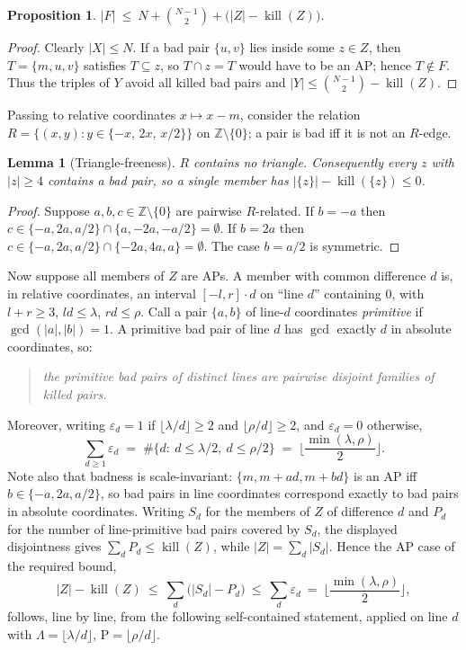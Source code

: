 \documentclass[11pt]{article}
\newtheorem{lemma}[theorem]{Lemma}
\newtheorem{proposition}[theorem]{Proposition}
\theoremstyle{definition}
\newcommand{\Z}{\mathbb{Z}}
\newcommand{\killop}{\operatorname{kill}}
\begin{document}
\begin{proposition}\label{prop:red}
$|F|\ \le\ N+\binom{N-1}{2}+\big(|Z|-\killop(Z)\big)$.
\end{proposition}

\begin{proof}
Clearly $|X|\le N$. If a bad pair $\{u,v\}$ lies inside some $z\in Z$, then $T=\{m,u,v\}$ satisfies $T\subseteq z$, so $T\cap z=T$ would have to be an AP; hence $T\notin F$. Thus the triples of $Y$ avoid all killed bad pairs and $|Y|\le\binom{N-1}{2}-\killop(Z)$.
\end{proof}

Passing to relative coordinates $x\mapsto x-m$, consider the relation
$R=\{(x,y): y\in\{-x,\,2x,\,x/2\}\}$ on $\Z\setminus\{0\}$;
a pair is bad iff it is not an $R$-edge.

\begin{lemma}[Triangle-freeness]\label{lem:tri}
$R$ contains no triangle. Consequently every $z$ with $|z|\ge 4$ contains a bad pair, so a single member has $|\{z\}|-\killop(\{z\})\le 0$.
\end{lemma}

\begin{proof}
Suppose $a,b,c\in\Z\setminus\{0\}$ are pairwise $R$-related. If $b=-a$ then $c\in\{-a,2a,a/2\}\cap\{a,-2a,-a/2\}=\emptyset$. If $b=2a$ then $c\in\{-a,2a,a/2\}\cap\{-2a,4a,a\}=\emptyset$. The case $b=a/2$ is symmetric.
\end{proof}

Now suppose all members of $Z$ are APs. A member with common difference $d$ is, in relative coordinates, an interval $[-l,r]\cdot d$ on ``line $d$'' containing $0$, with $l+r\ge 3$, $ld\le\lambda$, $rd\le\rho$. Call a pair $\{a,b\}$ of line-$d$ coordinates \emph{primitive} if $\gcd(|a|,|b|)=1$. A primitive bad pair of line $d$ has $\gcd$ exactly $d$ in absolute coordinates, so:

\begin{quote}\emph{the primitive bad pairs of distinct lines are pairwise disjoint families of killed pairs.}\end{quote}

Moreover, writing $\varepsilon_d=1$ if $\lfloor\lambda/d\rfloor\ge 2$ and $\lfloor\rho/d\rfloor\ge 2$, and $\varepsilon_d=0$ otherwise,
\begin{equation}\label{eq:epsum}
 \sum_{d\ge 1}\varepsilon_d \;=\; \#\{d:\ d\le \lambda/2,\ d\le\rho/2\}\;=\;\Big\lfloor\frac{\min(\lambda,\rho)}{2}\Big\rfloor .
\end{equation}
Note also that badness is scale-invariant: $\{m,m+ad,m+bd\}$ is an AP iff $b\in\{-a,2a,a/2\}$, so bad pairs in line coordinates correspond exactly to bad pairs in absolute coordinates. Writing $S_d$ for the members of $Z$ of difference $d$ and $P_d$ for the number of line-primitive bad pairs covered by $S_d$, the displayed disjointness gives $\sum_d P_d\le\killop(Z)$, while $|Z|=\sum_d|S_d|$. Hence the AP case of the required bound,
\[ |Z|-\killop(Z)\ \le\ \sum_d\bigl(|S_d|-P_d\bigr)\ \le\ \sum_d\varepsilon_d\ =\ \Big\lfloor\frac{\min(\lambda,\rho)}{2}\Big\rfloor, \]
follows, line by line, from the following self-contained statement, applied on line $d$ with $\Lambda=\lfloor\lambda/d\rfloor$, $\mathrm{P}=\lfloor\rho/d\rfloor$.
\end{document}

